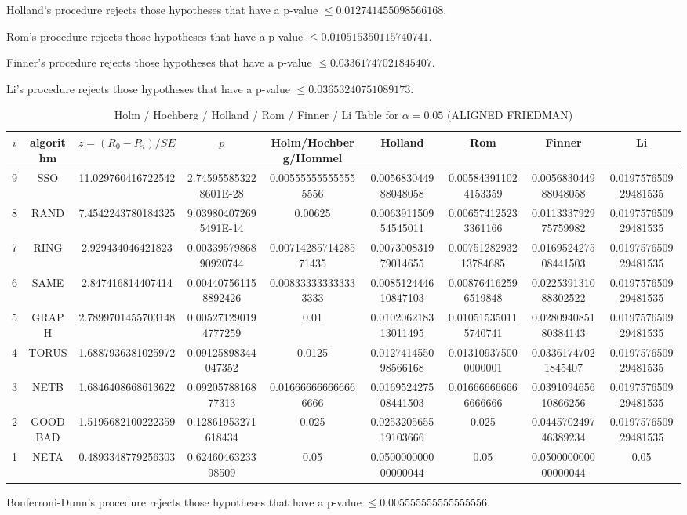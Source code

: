 \documentclass[a4paper,10pt]{article}
\begin{document}
\begin{landscape}
Holland's procedure rejects those hypotheses that have a p-value $\le0.012741455098566168$.


Rom's procedure rejects those hypotheses that have a p-value $\le0.010515350115740741$.


Finner's procedure rejects those hypotheses that have a p-value $\le0.03361747021845407$.


Li's procedure rejects those hypotheses that have a p-value $\le0.03653240751089173$.



\newpage

\begin{table}[!htp]
\centering\scriptsize
\caption{Holm / Hochberg / Holland / Rom / Finner / Li Table for $\alpha=0.05$ (ALIGNED FRIEDMAN)}
\begin{tabular}{ccccccccc}
$i$&algorithm&$z=(R_0 - R_i)/SE$&$p$&Holm/Hochberg/Hommel&Holland&Rom&Finner&Li\\
\hline
9& SSO&11.029760416722542&2.745955853228601E-28&0.005555555555555556&0.005683044988048058&0.005843911024153359&0.005683044988048058&0.019757650929481535\\
8& RAND&7.4542243780184325&9.039804072695491E-14&0.00625&0.006391150954545011&0.006574125233361166&0.011333792975759982&0.019757650929481535\\
7& RING&2.929434046421823&0.0033957986890920744&0.0071428571428571435&0.007300831979014655&0.0075128293213784685&0.016952427508441503&0.019757650929481535\\
6& SAME&2.847416814407414&0.004407561158892426&0.008333333333333333&0.008512444610847103&0.008764162596519848&0.022539131088302522&0.019757650929481535\\
5& GRAPH&2.7899701455703148&0.005271290194777259&0.01&0.010206218313011495&0.010515350115740741&0.028094085180384143&0.019757650929481535\\
4& TORUS&1.6887936381025972&0.09125898344047352&0.0125&0.012741455098566168&0.013109375000000001&0.03361747021845407&0.019757650929481535\\
3& NETB&1.6846408668613622&0.0920578816877313&0.016666666666666666&0.016952427508441503&0.016666666666666666&0.039109465610866256&0.019757650929481535\\
2& GOODBAD&1.5195682100222359&0.12861953271618434&0.025&0.025320565519103666&0.025&0.044570249746389234&0.019757650929481535\\
1& NETA&0.4893348779256303&0.6246046323398509&0.05&0.050000000000000044&0.05&0.050000000000000044&0.05\\
\hline
\end{tabular}
\end{table}
Bonferroni-Dunn's procedure rejects those hypotheses that have a p-value $\le0.005555555555555556$.



\end{landscape}
\end{document}
